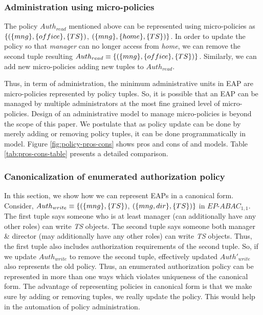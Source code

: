 \vspace{-1em}

\subsubsection{Administration using micro-policies}
\label{sec:usefulness}

The policy $Auth_{read}$ mentioned above can be represented using micro-policies as $\{( \{mng\}, \{office\}, \{TS\} )$, $( \{mng\}, \{home\}, \{TS\} )\}$. In order to update the policy so that \textit{manager} can no longer access from \textit{home}, we can remove the second tuple resulting $Auth_{read} \equiv \{( \{mng\}, \{office\}, \{TS\} )\}$. Similarly, we can add new micro-policies adding new tuples to $Auth_{read}$.

Thus, in term of administration, the minimum administrative units in EAP are micro-policies represented by policy tuples. So, it is possible that an EAP can be managed by multiple administrators at the most fine grained level of micro-policies. Design of an administrative model to manage micro-policies is beyond the scope of this paper. We postulate that as policy update can be done by merely adding or removing policy tuples,  it can be done programmatically  in \EPModels{} model. Figure \ref{fig:policy-pros-cons} shows pros and cons of \EPModels{} and \LPModels{} models. Table \ref{tab:pros-cons-table} presents a detailed comparison.




\vspace{-1em}


\subsubsection{Canonicalization of enumerated authorization policy}

In this section, we show how we can represent EAPs in a canonical form. Consider, $Auth_{write} \equiv \{( \{mng\}, \{TS\} )$, $ ( \{mng, dir\}, \{TS\} )\}$ in $EP$-$ABAC_{1,1}$. The first tuple says someone who is at least manager (can additionally have any other roles) can write \textit{TS} objects. The second tuple says someone both manager \& director (may additionally have any other roles) can write \textit{TS} objects. Thus, the first tuple also includes authorization requirements of the second tuple. So, if we update $Auth_{write}$ to remove the second tuple,  effectively updated $Auth'_{write}$ also represents the old policy. Thus, an enumerated authorization  policy can be represented in more than one ways which violates uniqueness of the canonical form. The advantage of representing policies in canonical form is that we make sure by adding or removing tuples, we really update the policy.  This would help  in the automation of policy administration. 


